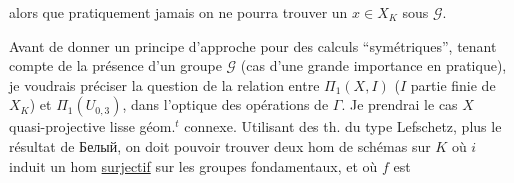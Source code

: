 alors que pratiquement jamais on ne pourra trouver un $x\in X_K$   sous $\mathcal G$.

Avant de donner un principe d'approche pour des calculs ``symétriques'', tenant compte de la présence d'un groupe $\mathcal G$ (cas d'une grande importance en pratique), je voudrais préciser la question de la relation entre $\Pi_1(X,I)$ ($I$ partie finie de $X_K$) et $\Pi_1(U_{0,3})$,  dans l'optique des opérations de $\Gamma$.
  Je prendrai le cas $X$ quasi-projective lisse géom.$^t$ connexe. Utilisant des th. du type Lefschetz, plus le résultat de  Белый, on  doit pouvoir trouver deux hom de schémas sur $K$
où $i$ induit un hom \uline{surjectif} sur les groupes fondamentaux, et où $f$ est
